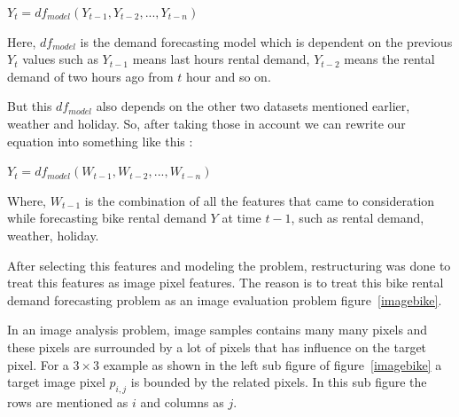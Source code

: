 $Y_t= df_{model} (Y_{t-1},Y_{t-2},...,Y_{t-n})$

Here, $df_{model}$ is the demand forecasting model which is dependent on the previous $Y_t$ values such as $Y_{t-1}$ means last hours rental demand, $Y_{t-2}$ means the rental demand of two hours ago from $t$ hour and so on. 

But this $df_{model}$  also depends on the other two datasets mentioned earlier, weather and holiday. So, after taking those in account we can rewrite our equation into something like this :

 
$Y_t= df_{model} (W_{t-1},W_{t-2},...,W_{t-n})$

Where, $W_{t-1}$ is the combination of all the features that came to consideration while forecasting bike rental demand $Y$ at time $t-1$, such as rental demand, weather, holiday. 

After selecting this features and modeling the problem, restructuring was done to treat this features as image pixel features. The reason is to treat this bike rental demand forecasting problem as an image evaluation problem figure~\ref{imagebike}.    


\begin{figure}
\centering
{}
\end{figure}


In an image analysis problem, image samples contains many many pixels and these pixels are surrounded by a lot of pixels that has influence on the target pixel. For a $3\times3$ example as shown in the left sub figure of figure~\ref{imagebike} a target image pixel $p_{i,j}$ is bounded by the related pixels. In this sub figure the rows are mentioned as $i$ and columns as $j$. 

